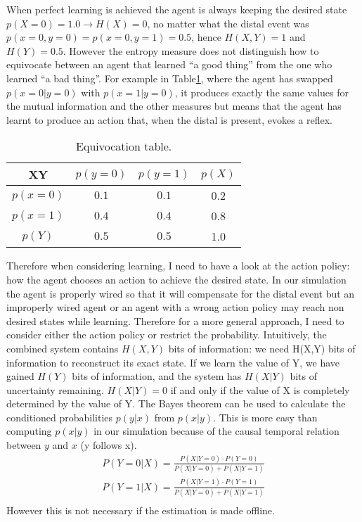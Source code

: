 When perfect learning is achieved the agent is always keeping the desired state 
$p(X=0)=1.0\rightarrow H(X)=0$, no matter what the distal event was $p(x=0,y=0)=p(x=0,y=1)=0.5$, 
hence $H(X,Y)=1$ and $H(Y)=0.5$.
However the entropy measure does not distinguish how to equivocate between an agent that
 learned ``a good thing'' from the one who learned ``a bad thing''.
For example in Table\ref{table:equivocation}, where the agent has swapped $p(x=0|y=0)$ 
with $p(x=1|y=0)$, it produces exactly the same values for the mutual information and 
the other measures but means that the agent has learnt to produce an action that, 
when the distal is present, evokes a reflex.\\

\begin{table}[htbp]
\caption{Equivocation table. \label{table:equivocation}}
\begin{center}
\begin{tabular}{|c| c| c| c|}
\hline
  XY	   & $p(y=0)$ & $p(y=1)$ & $p(X)$\\
\hline
  $p(x=0)$ & $0.1$    & $0.1$    & 0.2\\
  $p(x=1)$ & $0.4$    & $0.4$    & 0.8\\
\hline
  $p(Y)$   & $0.5$    & $0.5$    & 1.0\\
\hline
\end{tabular}
\end{center}
\end{table}

Therefore when considering learning, I need to have a look at the action policy: 
how the agent chooses an action to achieve the desired state. In our simulation the 
agent is properly wired so that it will compensate for the distal event but an 
improperly wired agent or an agent with a wrong action policy may reach non desired
 states while learning.
Therefore for a more general approach, I need to consider either the action 
policy or restrict the probability.
Intuitively, the combined system contains $H(X,Y)$ bits of information: we need H(X,Y) 
bits of information to reconstruct its exact state. If we learn the value of Y, 
we have gained $H(Y)$ bits of information, and the system has $H(X|Y)$ bits of 
uncertainty remaining. $H(X|Y) = 0$ if and only if the value of X is completely 
determined by the value of Y.
The Bayes theorem can be used to calculate the conditioned probabilities $p(y|x)$ 
from $p(x|y)$. This is more easy than computing $p(x|y)$ in our simulation because 
of the causal  temporal relation between $y$ and $x$ (y follows x).
\begin{eqnarray}
P(Y=0|X)=\frac{P(X|Y=0)\cdot P(Y=0)}{P(X|Y=0)+P(X|Y=1)}\\
P(Y=1|X)=\frac{P(X|Y=1)\cdot P(Y=1)}{P(X|Y=0)+P(X|Y=1)}\\
\end{eqnarray}
However this is not necessary if the estimation is made offline.

